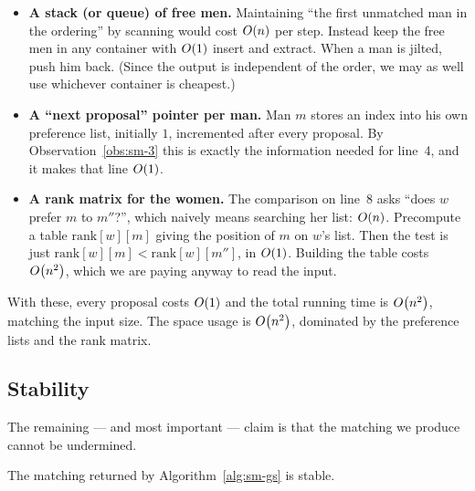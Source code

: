 \begin{itemize}
  \item \textbf{A stack (or queue) of free men.} Maintaining ``the first
        unmatched man in the ordering'' by scanning would cost $O\!\left(n\right)$ per
        step. Instead keep the free men in any container with $O\!\left(1\right)$
        insert and extract. When a man is jilted, push him back. (Since the
        output is independent of the order, we may as well use whichever
        container is cheapest.)
  \item \textbf{A ``next proposal'' pointer per man.} Man $m$ stores an index
        into his own preference list, initially $1$, incremented after every
        proposal. By Observation~\ref{obs:sm-3} this is exactly the information
        needed for line~4, and it makes that line $O\!\left(1\right)$.
  \item \textbf{A rank matrix for the women.} The comparison on line~8 asks
        ``does $w$ prefer $m$ to $m''$?'', which naively means searching her
        list: $O\!\left(n\right)$. Precompute a table $\mathrm{rank}[w][m]$ giving the
        position of $m$ on $w$'s list. Then the test is just
        $\mathrm{rank}[w][m] < \mathrm{rank}[w][m'']$, in $O\!\left(1\right)$.
        Building the table costs $O\!\left(n^2\right)$, which we are paying anyway to
        read the input.
\end{itemize}

With these, every proposal costs $O\!\left(1\right)$ and the total running time is
$O\!\left(n^2\right)$, matching the input size. The space usage is $O\!\left(n^2\right)$,
dominated by the preference lists and the rank matrix.

\subsection{Stability}

The remaining --- and most important --- claim is that the matching we produce
cannot be undermined.

\begin{theorem}[Correctness]\label{thm:sm-stable}
The matching returned by Algorithm~\ref{alg:sm-gs} is stable.
\end{theorem}

